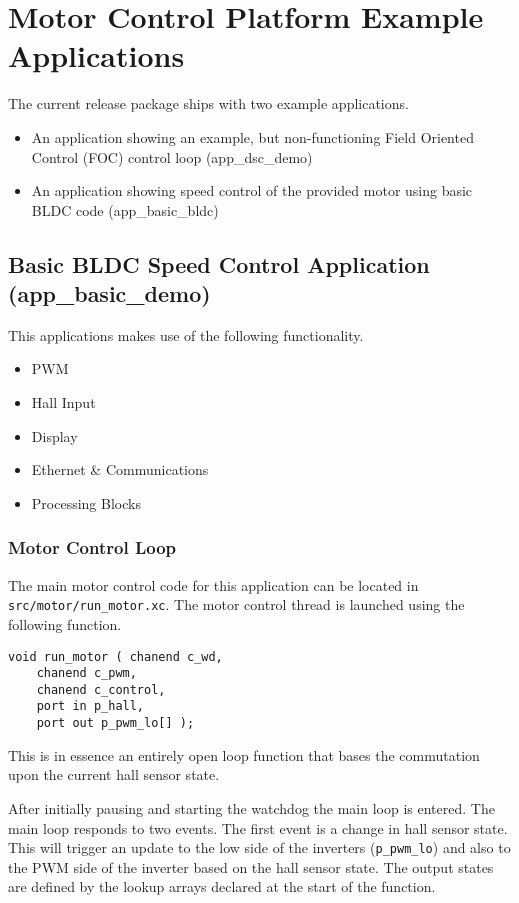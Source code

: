 \section{Motor Control Platform Example Applications}
The current release package ships with two example applications.

\begin{itemize}
\item An application showing an example, but non-functioning Field Oriented Control (FOC) control loop (app\_dsc\_demo)
\item An application showing speed control of the provided motor using basic BLDC code (app\_basic\_bldc)
\end{itemize}

\subsection{Basic BLDC Speed Control Application (app\_basic\_demo)}
This applications makes use of the following functionality.

\begin{itemize}
\item PWM
\item Hall Input
\item Display
\item Ethernet \& Communications
\item Processing Blocks
\end{itemize}

\subsubsection{Motor Control Loop}
The main motor control code for this application can be located in \newline \verb=src/motor/run_motor.xc=. The motor control thread is launched using the following function.

\begin{lstlisting}
void run_motor ( chanend c_wd, 
	chanend c_pwm, 
	chanend c_control, 
	port in p_hall, 
	port out p_pwm_lo[] );
\end{lstlisting}

This is in essence an entirely open loop function that bases the commutation upon the current hall sensor state.

After initially pausing and starting the watchdog the main loop is entered. The main loop responds to two events. The first event is a change in hall sensor state. This will trigger an update to the low side of the inverters (\verb=p_pwm_lo=) and also to the PWM side of the inverter based on the hall sensor state. The output states are defined by the lookup arrays declared at the start of the function.

